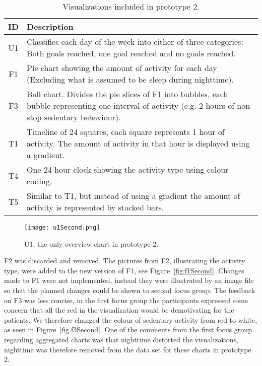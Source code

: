 \begin{table}[h!]
  \centering
  \begin{tabular}{|c|p{11cm}|}
    \hline
    \textbf{ID} & \textbf{Description} \\ \hline
    U1 & Classifies each day of the week into either of three categories: Both goals reached, one goal reached and no goals reached. \\ \hline
    F1 & Pie chart showing the amount of activity for each day (Excluding what is assumed to be sleep during nighttime). \\ \hline
    F3 & Ball chart. Divides the pie slices of F1 into bubbles, each bubble representing one interval of activity (e.g. 2 hours of non-stop sedentary behaviour). \\ \hline
    T1 & Timeline of 24 squares, each square represents 1 hour of activity. The amount of activity in that hour is displayed using a gradient. \\ \hline
    T4 & One 24-hour clock showing the activity type using colour coding. \\ \hline
    T5 & Similar to T1, but instead of using a gradient the amount of activity is represented by stacked bars. \\ \hline
  \end{tabular}
  \caption[Visualizations in the second prototype]{Visualizations included in prototype 2.}
  \label{tab:runProtDesc2}
\end{table}

\begin{figure}[h!]
  \centering
  \texttt{[image: u1Second.png]}
  \caption[Second version of U1]{U1, the only overview chart in prototype 2.}
  \label{fig:uSecond}
\end{figure}

F2 was discarded and removed. The pictures from F2, illustrating the activity type, were added to the new version of F1, see Figure~\ref{fig:f1Second}. Changes made to F1 were not implemented, instead they were illustrated by an image file so that the planned changes could be shown to second focus group. The feedback on F3 was less concise, in the first focus group the participants expressed some concern that all the red in the visualization would be demotivating for the patients. We therefore changed the colour of sedentary activity from red to white, as seen in Figure~\ref{fig.f3Second}. One of the comments from the first focus group regarding aggregated charts was that nighttime distorted the visualizations, nighttime was therefore removed from the data set for these charts in prototype 2.

